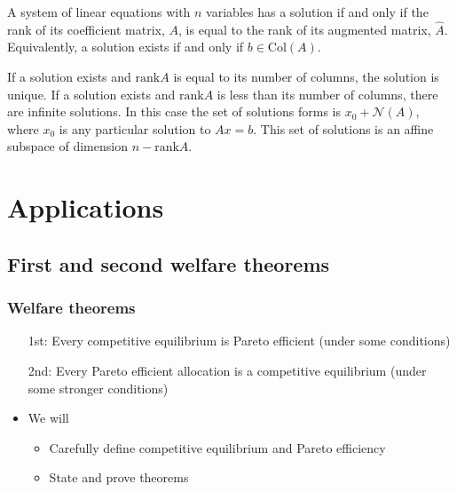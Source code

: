 \documentclass[compress]{beamer}
\newcommand{\rank}{\mathrm{rank}}
\newcommand{\col}{\mathrm{Col}}
\begin{document}
\begin{frame}
  \begin{theorem} \label{thm:rc} A system of linear
    equations with $n$ variables has a solution if and only if the rank
    of its coefficient matrix, $A$, is equal to the rank of its
    augmented matrix, $\hat{A}$. Equivalently, a solution exists if and
    only if $b \in \col(A)$.
    
    If a solution exists and $\rank A$ is equal to its number of
    columns, the solution is unique. If a solution exists and $\rank A$
    is less than its number of columns, there are infinite solutions. In
    this case the set of solutions forms is $x_0 + \mathcal{N}(A)$,
    where $x_0$ is any particular solution to $A x = b$. This set of
    solutions is an affine subspace of dimension $n - \rank A$.
  \end{theorem}
\end{frame}

\section{Applications}

\subsection{First and second welfare theorems}

\begin{frame}
  \frametitle{Welfare theorems}
  \begin{itemize}
  \item[1st:] Every competitive equilibrium is Pareto efficient (under
    some conditions)
  \item[2nd:] Every Pareto efficient allocation is a competitive
    equilibrium (under some stronger conditions)
  \item We will
    \begin{itemize}
    \item Carefully define competitive equilibrium and Pareto
      efficiency
    \item State and prove theorems
    \end{itemize}
  \end{itemize}
\end{frame}
\end{document}
